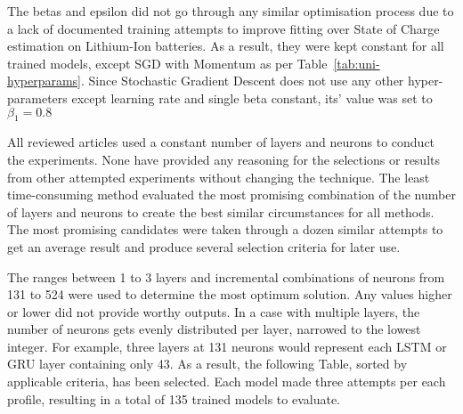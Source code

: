 %
The betas and epsilon did not go through any similar optimisation process due to a lack of documented training attempts to improve fitting over State of Charge estimation on Lithium-Ion batteries.
As a result, they were kept constant for all trained models, except SGD with Momentum as per \mbox{Table~\ref{tab:uni-hyperparams}}.
Since Stochastic Gradient Descent does not use any other hyper-parameters except learning rate and single beta constant, its' value was set to $\beta_1 = 0.8$
\begin{table}[htbp]
  \renewcommand{\arraystretch}{1.3}
  \caption{Optimisers Hyper-Parameters}
  \centering
  \label{tab:uni-hyperparams}
\end{table}

%
All reviewed articles used a constant number of layers and neurons to conduct the experiments.
None have provided any reasoning for the selections or results from other attempted experiments without changing the technique.
The least time-consuming method evaluated the most promising combination of the number of layers and neurons to create the best similar circumstances for all methods.
The most promising candidates were taken through a dozen similar attempts to get an average result and produce several selection criteria for later use.

%
The ranges between 1 to 3 layers and incremental combinations of neurons from 131 to 524 were used to determine the most optimum solution.
Any values higher or lower did not provide worthy outputs.
In a case with multiple layers, the number of neurons gets evenly distributed per layer, narrowed to the lowest integer.
For example, three layers at 131 neurons would represent each LSTM or GRU layer containing only 43.
As a result, the following Table, sorted by applicable criteria, has been selected.
Each model made three attempts per each profile, resulting in a total of 135 trained models to evaluate.
